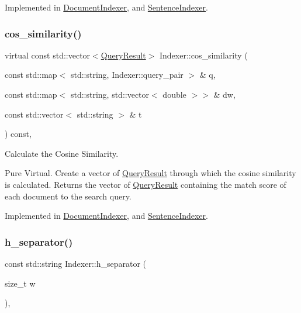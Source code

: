 Implemented in \hyperlink{class_document_indexer_a4bd5fd7be55de9932933dd6f7bfa7d9f}{Document\+Indexer}, and \hyperlink{class_sentence_indexer_af3299500d89ff36586472f81eb8efae8}{Sentence\+Indexer}.

\mbox{\label{class_indexer_a52bcf307b7fea4f3c6e7b440bc60d2fe}} 
\subsubsection{\texorpdfstring{cos\+\_\+similarity()}{cos\_similarity()}}
{\footnotesize\ttfamily virtual const std\+::vector$<$\hyperlink{class_query_result}{Query\+Result}$>$ Indexer\+::cos\+\_\+similarity (\begin{DoxyParamCaption}\item[{const std\+::map$<$ std\+::string, Indexer\+::query\+\_\+pair $>$ \&}]{q,  }\item[{const std\+::map$<$ std\+::string, std\+::vector$<$ double $>$$>$ \&}]{dw,  }\item[{const std\+::vector$<$ std\+::string $>$ \&}]{t }\end{DoxyParamCaption}) const\hspace{0.3cm}{\ttfamily [protected]}, {}}



Calculate the Cosine Similarity. 

Pure Virtual. Create a vector of \hyperlink{class_query_result}{Query\+Result} through which the cosine similarity is calculated. Returns the vector of \hyperlink{class_query_result}{Query\+Result} containing the match score of each document to the search query. 

Implemented in \hyperlink{class_document_indexer_a8738997048b5bfd336f48bade7715cc6}{Document\+Indexer}, and \hyperlink{class_sentence_indexer_a913914f26a73e00f293308baff97e23f}{Sentence\+Indexer}.

\mbox{\label{class_indexer_adee34c99c25edcfd4a2b2ae6fe06c3cc}} 
\subsubsection{\texorpdfstring{h\+\_\+separator()}{h\_separator()}}
{\footnotesize\ttfamily const std\+::string Indexer\+::h\+\_\+separator (\begin{DoxyParamCaption}\item[{size\+\_\+t}]{w }\end{DoxyParamCaption})\hspace{0.3cm}{\ttfamily [static]}, {\ttfamily [protected]}}


